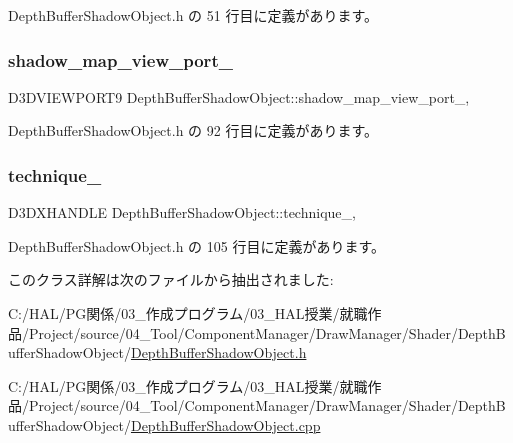  Depth\+Buffer\+Shadow\+Object.\+h の 51 行目に定義があります。

\mbox{\label{class_depth_buffer_shadow_object_a08c029f49fa8cf59b8458d3c2be0138e}} 
\subsubsection{\texorpdfstring{shadow\+\_\+map\+\_\+view\+\_\+port\+\_\+}{shadow\_map\_view\_port\_}}
{\footnotesize\ttfamily D3\+D\+V\+I\+E\+W\+P\+O\+R\+T9 Depth\+Buffer\+Shadow\+Object\+::shadow\+\_\+map\+\_\+view\+\_\+port\+\_\+\hspace{0.3cm}{\ttfamily [static]}, {\ttfamily [private]}}



 Depth\+Buffer\+Shadow\+Object.\+h の 92 行目に定義があります。

\mbox{\label{class_depth_buffer_shadow_object_ab8fd271667e849ed9dfbdf9de2fe9fa5}} 
\subsubsection{\texorpdfstring{technique\+\_\+}{technique\_}}
{\footnotesize\ttfamily D3\+D\+X\+H\+A\+N\+D\+LE Depth\+Buffer\+Shadow\+Object\+::technique\+\_\+\hspace{0.3cm}{\ttfamily [static]}, {\ttfamily [private]}}



 Depth\+Buffer\+Shadow\+Object.\+h の 105 行目に定義があります。



このクラス詳解は次のファイルから抽出されました\+:\begin{DoxyCompactItemize}
\item 
C\+:/\+H\+A\+L/\+P\+G関係/03\+\_\+作成プログラム/03\+\_\+\+H\+A\+L授業/就職作品/\+Project/source/04\+\_\+\+Tool/\+Component\+Manager/\+Draw\+Manager/\+Shader/\+Depth\+Buffer\+Shadow\+Object/\mbox{\hyperlink{_depth_buffer_shadow_object_8h}{Depth\+Buffer\+Shadow\+Object.\+h}}\item 
C\+:/\+H\+A\+L/\+P\+G関係/03\+\_\+作成プログラム/03\+\_\+\+H\+A\+L授業/就職作品/\+Project/source/04\+\_\+\+Tool/\+Component\+Manager/\+Draw\+Manager/\+Shader/\+Depth\+Buffer\+Shadow\+Object/\mbox{\hyperlink{_depth_buffer_shadow_object_8cpp}{Depth\+Buffer\+Shadow\+Object.\+cpp}}\end{DoxyCompactItemize}
